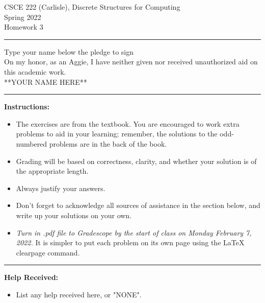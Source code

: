 \documentclass[12pt]{article}  %
\begin{document}
\begin{center}         %
{\large                %
CSCE 222 (Carlisle), Discrete Structures for Computing \\  %
Spring 2022 \\
Homework 3}
\end{center}
\rule{6in}{.1pt}       %
\begin{center}
{\large
Type your name below the pledge to sign\\
On my honor, as an Aggie, I have neither given nor received unauthorized aid on this academic work.\\
**YOUR NAME HERE**}
\end{center}


\rule{6in}{.1pt}       %
                    
\noindent              %
{\bf Instructions:}    %

\begin{itemize}        %
\item The exercises are from the textbook.  You are encouraged to work
      extra problems to aid in your learning; remember, the solutions to 
      the odd-numbered problems are in the back of the book.
\item Grading will be based on correctness, clarity, and whether your
      solution is of the appropriate length.
\item Always justify your answers.
\item Don't forget to acknowledge all sources of assistance in the section below, and write up your solutions on your own.
\item {\em Turn in .pdf file to Gradescope by the start of class on Monday February 7, 2022.}  It is simpler to put each problem on its own page using the LaTeX clearpage command.
\end{itemize}


\rule{6in}{.1pt}       %

{\bf Help Received:}    %
\begin{itemize}
\item List any help received here, or "NONE".
\end{itemize}
\end{document}
